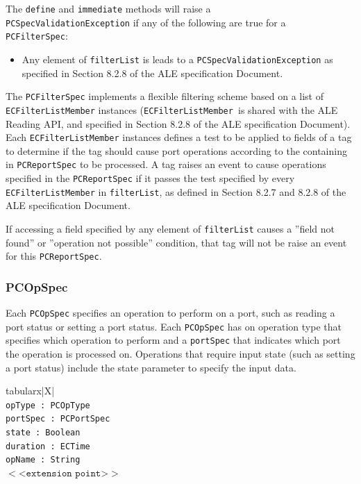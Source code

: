 \documentclass[11pt,a4paper,oneside]{article}
\newenvironment{bbox}%
{\begin{table}[h!]\begin{threeparttable}}%
{\end{threeparttable}\end{table}\FloatBarrier}
\newenvironment{bbox}
{\ifvmode\IgnorePar\fi \EndP\Tg<div class='bbox'>}{\Tg</div>\IgnoreIndent}
\begin{document}
The \texttt{define} and \texttt{immediate} methods will raise a \ifpdf\\\fi\texttt{PCSpecValidationException} if any of the following are true for a \ifpdf\\\fi\texttt{PCFilterSpec}:
\begin{itemize}
\item	Any element of \texttt{filterList} is leads to a \texttt{PCSpecValidationException} as specified in Section 8.2.8 of the ALE specification Document.
\end{itemize}

The \texttt{PCFilterSpec} implements a flexible filtering scheme based on a list of\ifpdf\\\fi
 \texttt{ECFilterListMember} instances (\texttt{ECFilterListMember }is shared with the ALE Reading API, and specified in Section 8.2.8 of the ALE specification Document). Each \texttt{ECFilterListMember} instances defines a test to be applied to fields of a tag to determine if the tag should cause port operations according to the containing in \texttt{PCReportSpec} to be processed. A tag raises an event to cause operations specified in the \texttt{PCReportSpec} if it passes the test specified by every \texttt{ECFilterListMember} in \texttt{filterList}, as defined in Section 8.2.7 and 8.2.8 of the ALE specification Document.

If accessing a field specified by any element of \texttt{filterList} causes a ''field not found'' or ''operation not possible'' condition, that tag will not be raise an event for this \texttt{PCReportSpec}.

\subsubsection{PCOpSpec}
\label{subsec: PCOpS}
Each \texttt{PCOpSpec} specifies an operation to perform on a port, such as reading a port status or setting a port status.  Each \texttt{PCOpSpec} has on operation type that specifies which operation to perform and a \texttt{portSpec} that indicates which port the operation is processed on. Operations that require input state (such as setting a port status) include the state parameter to specify the input data.

\begin{bbox}
\begin{edtable}{tabularx}{\linewidth}{|X|}
\hline 
{}
\\
\texttt{opType : PCOpType}\\
\texttt{portSpec : PCPortSpec}\\
\texttt{state : Boolean}\\
\texttt{duration : ECTime}\\
\texttt{opName  : String}\\
$<$<$ \texttt{extension point} $>$>$\\
\texttt{\textendash \textendash \textendash}\\
\hline
\end{edtable}
\end{bbox}
\end{document}
